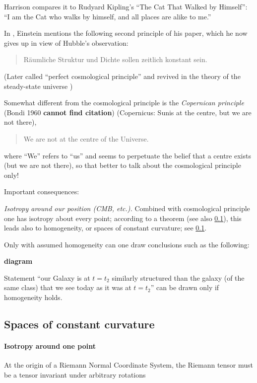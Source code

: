 Harrison compares it to Rudyard Kipling's ``The Cat That Walked by Himself'': 
``I am the Cat who walks by himself, and all places are alike to me.''

In \citeyear{einstein1930kosmologischen}, Einstein mentions the following 
second principle of his \citeyear{einstein1917kosmologische} paper, which he 
now gives up in view of Hubble's observation:
\begin{quote}
R\"aumliche Struktur und Dichte sollen zeitlich konstant sein.
\end{quote}
(Later called ``perfect cosmological principle'' and revived in the theory of 
the steady-state universe \cite{Hoyle1948,Bondi1948})

Somewhat different from the cosmological principle is the \emph{Copernican 
principle} (Bondi 1960 \textbf{cannot find citation}) (Copernicus: Sunis at 
the centre, but we are not there),
\begin{quote}
We are not at the centre of the Universe.
\end{quote}
where ``We'' refers to ``us'' and seems to perpetuate the belief that a centre 
exists (but we are not there), so that better to talk about the cosmological 
principle only!

Important consequences:

\emph{Isotropy around our position (CMB, etc.).} Combined with cosmological 
principle one has isotropy about every point; according to a theorem 
\cite{Schur1886} (see also \cref{ssec:constant-curvature}), this 
leads also to homogeneity, or spaces of constant curvature; see 
\cref{ssec:constant-curvature}.

Only with assumed homogeneity can one draw conclusions such as the following:

\textbf{diagram}

Statement ``our Galaxy is at $t = t_2$ similarly structured than the galaxy 
(of the same class) that we see today as it was at $t=t_2$'' can be drawn only 
if homogeneity holds.

\subsection{Spaces of constant curvature}
\label{ssec:constant-curvature}
\paragraph{Isotropy around one point}
At the origin of a Riemann Normal Coordinate System, the Riemann tensor must be 
a tensor invariant under arbitrary rotations


